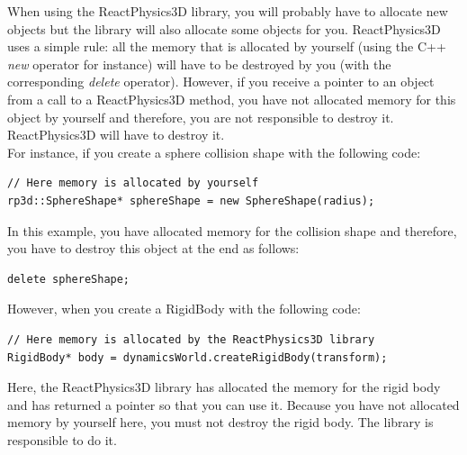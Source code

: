 \documentclass[a4paper,12pt]{article}
\begin{document}
   When using the ReactPhysics3D library, you will probably have to allocate new objects but the library will also allocate some objects for you. ReactPhysics3D uses a simple rule:
   all the memory that is allocated by yourself (using the C++ \emph{new} operator for instance) will have to be destroyed by you (with the corresponding \emph{delete} operator). However, if you
   receive a pointer to an object from a call to a ReactPhysics3D method, you have not allocated memory for this object by yourself and therefore, you are not responsible to destroy it. ReactPhysics3D
   will have to destroy it. \\

   For instance, if you create a sphere collision shape with the following code: \\

    \begin{lstlisting}
// Here memory is allocated by yourself
rp3d::SphereShape* sphereShape = new SphereShape(radius);
    \end{lstlisting}
    
    \vspace{0.6cm}

    In this example, you have allocated memory for the collision shape and therefore, you have to destroy this object at the end as follows: \\

    \begin{lstlisting}
delete sphereShape;
    \end{lstlisting}
    
    \vspace{0.6cm}

    However, when you create a RigidBody with the following code: \\

    \begin{lstlisting}
// Here memory is allocated by the ReactPhysics3D library
RigidBody* body = dynamicsWorld.createRigidBody(transform);
    \end{lstlisting}
    
    \vspace{0.6cm}

    Here, the ReactPhysics3D library has allocated the memory for the rigid body and has returned a pointer so that you can use it. Because you have not allocated memory by yourself here, you must not
    destroy the rigid body. The library is responsible to do it. \\
\end{document}
